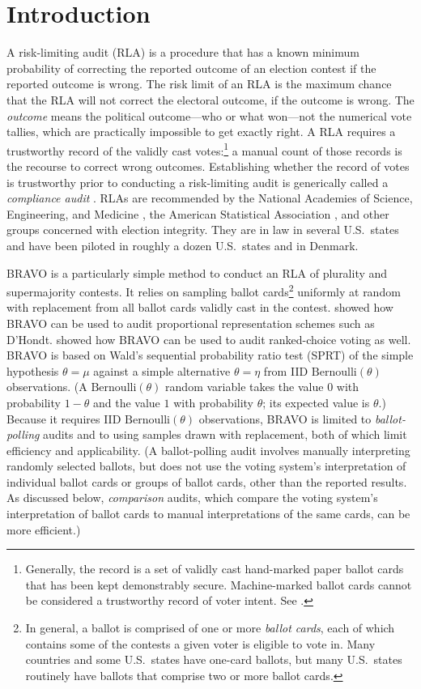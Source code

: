 \documentclass[12pt,runningheads]{llncs}
\newcommand{\Bern}{\ensuremath{\mathrm{Bernoulli}}}
\begin{document}
{\section{Introduction}
A risk-limiting audit (RLA) is a procedure that has a known minimum probability of correcting the reported outcome of an election
contest if the reported outcome is wrong.
The risk limit of an RLA is the maximum chance that the RLA will not correct the electoral outcome, if the outcome is wrong.
The \emph{outcome} means the political outcome---who or what won---not the numerical vote tallies, which are practically impossible
to get exactly right.
A RLA requires a trustworthy record of the validly cast votes:\footnote{%
Generally, the record is a set of validly cast hand-marked paper ballot cards that has been kept demonstrably secure.
Machine-marked ballot cards cannot be considered a trustworthy record of voter intent.
See \cite{appelEtal20,appelStark20,starkWagner12}.
}
a manual count of those records is the recourse to correct
wrong outcomes.
Establishing whether the record of votes is trustworthy prior to conducting a risk-limiting audit is 
generically called a \emph{compliance audit} 
\cite{starkWagner12,appelStark20}.
RLAs are recommended by the National Academies of Science, Engineering, and Medicine \cite{nas18},
the American Statistical Association \cite{asa10}, and other groups concerned with election integrity.
They are in law in several U.S.\ states and have been piloted in roughly a dozen U.S.\ states and in Denmark.

BRAVO \cite{lindemanEtal12} is a particularly
simple method to conduct an RLA of plurality and supermajority contests.
It relies on sampling ballot cards\footnote{%
In general, a ballot is comprised of one or more \emph{ballot cards}, each of which contains some of the contests
a given voter is eligible to vote in.
Many countries and some U.S.\ states have one-card ballots, but many U.S.\ states routinely
have ballots that comprise two or more
ballot cards.
}  
uniformly at random with replacement from all ballot cards validly cast in the contest.
\cite{starkTeague14} showed how BRAVO can be used to audit proportional representation schemes such as D'Hondt.
\cite{blomEtal18} showed how BRAVO can be used to audit ranked-choice voting as well.
BRAVO is based on Wald's \cite{wald45} sequential probability ratio test (SPRT) of the simple hypothesis 
$\theta = \mu$ against a simple alternative $\theta = \eta$ from IID $\Bern(\theta)$ observations.
(A $\Bern(\theta)$ random variable takes the value $0$ with probability $1-\theta$ and the value $1$ with probability $\theta$;
its expected value is $\theta$.)
Because it requires IID $\Bern(\theta)$ observations, BRAVO is limited to \emph{ballot-polling} audits and to using samples drawn with 
replacement, both of which limit efficiency and applicability.
(A ballot-polling audit involves manually interpreting randomly selected ballots, but does not use the voting system's
interpretation of individual ballot cards or groups of ballot cards, other than the reported results.
As discussed below, \emph{comparison} audits, which compare the voting system's interpretation of ballot cards to
manual interpretations of the same cards, can be more efficient.)

}
\end{document}
